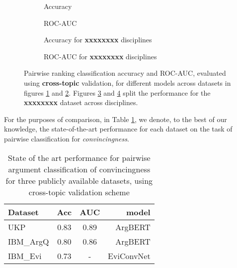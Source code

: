 \documentclass[runningheads]{llncs}
\begin{document}
\begin{figure}
	\begin{subfigure}[t]{0.5\linewidth}
		\centering
		\scalebox{0.4}{}
		\caption{Accuracy}
		\label{fig:acc_cross_topic}
	\end{subfigure}%
	\qquad
	\begin{subfigure}[t]{0.5\linewidth}
		\centering
		\scalebox{0.4}{}
		\caption{ROC-AUC}
		\label{fig:AUC_cross_topic}
	\end{subfigure}
	\begin{subfigure}[t]{0.5\linewidth}
		\centering
		\scalebox{0.4}{}
		\caption{Accuracy for \textbf{xxxxxxxx} disciplines}
		\label{fig:acc_dalite_cross_topic}
	\end{subfigure}%
	\qquad
	\begin{subfigure}[t]{0.5\linewidth}
		\centering
		\scalebox{0.4}{}
		\caption{ROC-AUC for \textbf{xxxxxxxx} disciplines}
		\label{fig:AUC_dalite_cross_topic}
	\end{subfigure}
	\caption{Pairwise ranking classification accuracy and ROC-AUC, evaluated 
		using \textbf{cross-topic} validation, for 
		different models across datasets in figures 
		\ref{fig:acc_cross_topic} 
		and \ref{fig:AUC_cross_topic}. Figures \ref{fig:acc_dalite_cross_topic} 
		and 
		\ref{fig:AUC_dalite_cross_topic} split the performance for the 
		\textbf{xxxxxxxx} dataset across disciplines.}
	\label{fig:performance_cross_topic}
	
\end{figure}


For the purposes of comparison, in Table \ref{tab:sota}, we denote, to the best 
of our knowledge, the state-of-the-art performance for each dataset on the task 
of pairwise  classification for \textit{convincingness}. 

\begin{table} 
	\caption{State of the art performance for pairwise argument classification 
	of 
	convincingness for three publicly available datasets, using cross-topic 
	validation scheme}
\label{tab:sota}
	\centering\begin{tabular}{l|*{2}{c}r}
		Dataset     & Acc & AUC & model  	   \\
		\hline
		UKP 		& 0.83 & 0.89 & ArgBERT\cite{toledo_automatic_2019}    \\
		IBM\_ArgQ   & 0.80 & 0.86 & ArgBERT\cite{toledo_automatic_2019}    \\
		IBM\_Evi    & 0.73 & - 	  & EviConvNet\cite{gleize_are_2019} \\
	\end{tabular}
\end{table}
\end{document}
